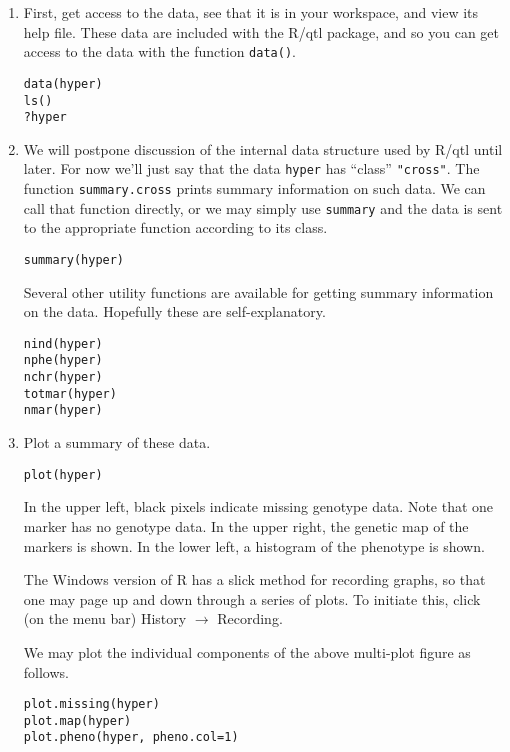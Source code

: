 \documentclass[10pt,letterpaper]{article}
\newcommand{\usercolor}{\color [named]{BlueViolet}}
\newcommand{\othercolor}{\color [named]{Mahogany}}
\begin{document}
\begin{enumerate}

\item First, get access to the data, see that it is in your
workspace, and view its help file.  These data are included with the
R/qtl package, and so you can get access to the data with the function
\verb-data()-.  

\usercolor \verb|data(hyper)| \\
\verb|ls()| \\
\verb|?hyper| \normalcolor

\item We will postpone discussion of the internal data structure used
by R/qtl until later.  For now we'll just say that the data
\verb-hyper- has ``class'' \verb-"cross"-.  The function
\verb-summary.cross- prints summary information on such data.  We can
call that function directly, or we may simply use \verb-summary- and
the data is sent to the appropriate function according to its class.

\usercolor \verb|summary(hyper)| 
\normalcolor

Several other utility functions are available for getting summary
information on the data.  Hopefully these are self-explanatory.  

\usercolor
\verb|nind(hyper)| \\
\verb|nphe(hyper)| \\
\verb|nchr(hyper)| \\
\verb|totmar(hyper)| \\
\verb|nmar(hyper)| \normalcolor

\item Plot a summary of these data.

\usercolor \verb|plot(hyper)| \normalcolor

In the upper left, black pixels indicate missing genotype data.  Note
that one marker has no genotype data.  In the upper right, the genetic
map of the markers is shown.  In the lower left, a histogram of the
phenotype is shown.

The Windows version of R has a slick method for recording
graphs, so that one may page up and down through a series of plots.
To initiate this, click (on the menu bar) \othercolor History
\normalcolor $\rightarrow$ \othercolor Recording\normalcolor .

We may plot the individual components of the above multi-plot figure
as follows.

\usercolor 
\verb|plot.missing(hyper)| \\
\verb|plot.map(hyper)| \\
\verb|plot.pheno(hyper, pheno.col=1)| %
\normalcolor


\end{enumerate}
\end{document}
